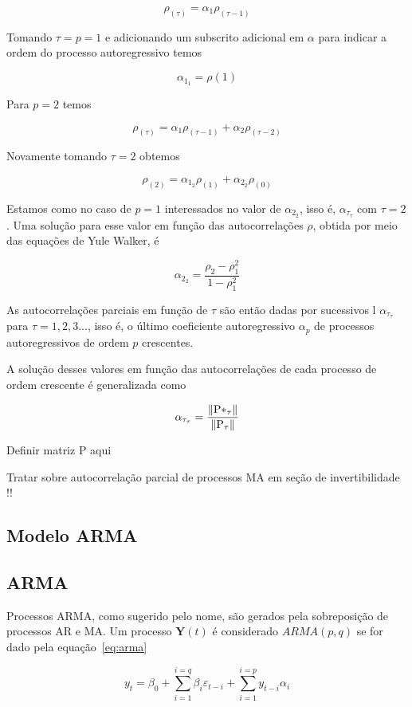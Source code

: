 $$ \rho_(\tau) = \alpha_1 \rho_(\tau - 1) $$

Tomando $\tau = p = 1$ e adicionando um subscrito adicional em $\alpha$ para
indicar a ordem do processo autoregressivo temos

$$ \alpha_{1_{1}} = \rho(1) $$

Para $p=2$ temos

$$ \rho_(\tau) = \alpha_1 \rho_(\tau - 1) + \alpha_2 \rho_(\tau - 2) $$

Novamente tomando $\tau = 2$ obtemos

$$ \rho_(2) = \alpha_{1_{2}} \rho_(1) + \alpha_{2_{2}} \rho_(0) $$

Estamos como no caso de $p=1$ interessados no valor de $\alpha_{2_{2}}$, isso é,
$\alpha_{\tau_{\tau}}$ com $\tau=2$. Uma solução para esse valor em função
das autocorrelações $\rho$, obtida por meio das equações de Yule Walker, é

$$ \alpha_{2_{2}} = \frac{\rho_2 - \rho^2_1}{1 - \rho^2_{1}} $$

As autocorrelações parciais em função de $\tau$ são então dadas por sucessivos
l $\alpha_{\tau_{\tau}}$ para $\tau = 1, 2, 3 ...$, isso é, o último coeficiente
autoregressivo $\alpha_p$ de processos autoregressivos de ordem $p$ crescentes.

A solução desses valores em função das autocorrelações de cada processo de
ordem crescente é generalizada como

$$ \alpha_{\tau_{\tau}} = \frac{\lVert\mathbf{\mathrm{P}*_{\tau}}\rVert}{\lVert\mathbf{\mathrm{P}_{\tau}}\rVert} $$

Definir matriz P aqui

Tratar sobre autocorrelação parcial de processos MA em seção de invertibilidade !!

\subsection{Modelo ARMA}
\label{ssec:ARMA}

\subsection{ARMA}\label{ssec:ARMA}

Processos ARMA, como sugerido pelo nome, são gerados pela sobreposição de
processos AR e MA. Um processo $\mathbf{Y}(t)$ é considerado $ARMA(p, q)$ se
for dado pela equação~\ref{eq:arma}

\begin{equation}\label{eq:arma}
    y_t = \beta_0 + \sum_{i=1}^{i=q} \beta_i \varepsilon_{t-i} + \sum_{i=1}^{i=p} y_{t-i}\alpha_i
\end{equation}

